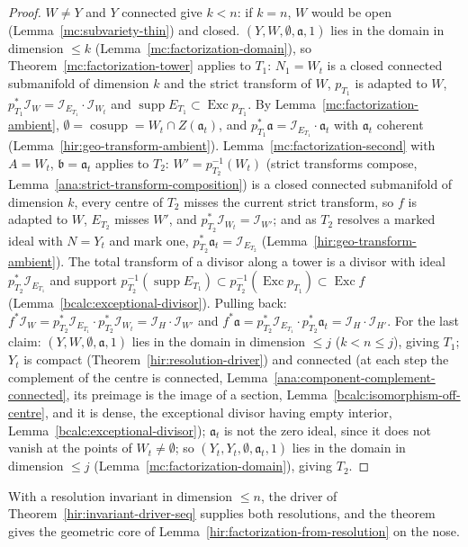 \begin{proof}
\leanok
\(W\ne Y\) and \(Y\) connected give \(k<n\): if \(k=n\), \(W\) would be open (Lemma~\ref{mc:subvariety-thin}) and closed. \((Y,W,\emptyset,\mathfrak a,1)\) lies in the domain in dimension
\(\le k\) (Lemma~\ref{mc:factorization-domain}), so Theorem~\ref{mc:factorization-tower} applies to \(T_1\): \(N_1=W_t\) is a closed connected submanifold of dimension \(k\) and the
strict transform of \(W\), \(p_{T_1}\) is adapted to \(W\), \(p_{T_1}^*\mathcal I_W=\mathcal I_{E_{T_1}}\cdot\mathcal I_{W_t}\) and \(\operatorname{supp}E_{T_1}\subset\operatorname{Exc}p_{T_1}\).
By Lemma~\ref{mc:factorization-ambient}, \(\emptyset=\operatorname{cosupp}=W_t\cap Z(\mathfrak a_t)\), and \(p_{T_1}^*\mathfrak a=\mathcal I_{E_{T_1}}\cdot\mathfrak a_t\) with \(\mathfrak a_t\)
coherent (Lemma~\ref{hir:geo-transform-ambient}). Lemma~\ref{mc:factorization-second} with \(A=W_t\), \(\mathfrak b=\mathfrak a_t\) applies to \(T_2\): \(W'=p_{T_2}^{-1}(W_t)\) (strict transforms
compose, Lemma~\ref{ana:strict-transform-composition}) is a closed connected submanifold of dimension \(k\), every centre of \(T_2\) misses the current strict transform, so \(f\) is
adapted to \(W\), \(E_{T_2}\) misses \(W'\), and \(p_{T_2}^*\mathcal I_{W_t}=\mathcal I_{W'}\); and as \(T_2\) resolves a marked ideal with \(N=Y_t\) and mark one,
\(p_{T_2}^*\mathfrak a_t=\mathcal I_{E_{T_2}}\) (Lemma~\ref{hir:geo-transform-ambient}). The total transform of a divisor along a tower is a divisor with ideal \(p_{T_2}^*\mathcal I_{E_{T_1}}\)
and support \(p_{T_2}^{-1}(\operatorname{supp}E_{T_1})\subset p_{T_2}^{-1}(\operatorname{Exc}p_{T_1})\subset\operatorname{Exc}f\) (Lemma~\ref{bcalc:exceptional-divisor}). Pulling back:
\(f^*\mathcal I_W=p_{T_2}^*\mathcal I_{E_{T_1}}\cdot p_{T_2}^*\mathcal I_{W_t}=\mathcal I_H\cdot\mathcal I_{W'}\) and \(f^*\mathfrak a=p_{T_2}^*\mathcal I_{E_{T_1}}\cdot p_{T_2}^*\mathfrak a_t=\mathcal
I_H\cdot\mathcal I_{H'}\). For the last claim: \((Y,W,\emptyset,\mathfrak a,1)\) lies in the domain in dimension \(\le j\) (\(k<n\le j\)), giving \(T_1\); \(Y_t\) is compact
(Theorem~\ref{hir:resolution-driver}) and connected (at each step the complement of the centre is connected, Lemma~\ref{ana:component-complement-connected}, its preimage is the image of a section, Lemma~\ref{bcalc:isomorphism-off-centre}, and it is dense, the exceptional divisor having empty interior, Lemma~\ref{bcalc:exceptional-divisor}); \(\mathfrak a_t\)
is not the zero ideal, since it does not vanish at the points of \(W_t\neq\emptyset\); so \((Y_t,Y_t,\emptyset,\mathfrak a_t,1)\) lies in the domain in dimension \(\le j\)
(Lemma~\ref{mc:factorization-domain}), giving \(T_2\).
\end{proof}
With a resolution invariant in dimension \(\le n\), the driver of Theorem~\ref{hir:invariant-driver-seq} supplies both resolutions, and the theorem gives the geometric core of
Lemma~\ref{hir:factorization-from-resolution} on the nose.

